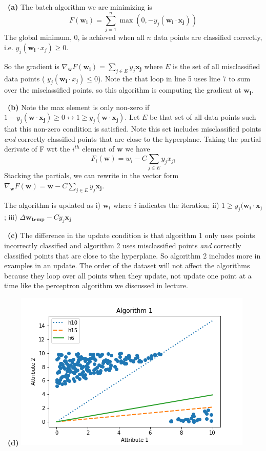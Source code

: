 \documentclass[a4 paper, 15pt]{article}
\numberwithin{equation}{section}
\newcommand{\problem}[1]{~\\\fbox{\textbf{Problem #1}}\newline\newline}
\newcommand{\subproblem}[1]{~\newline\textbf{(#1)}}
\begin{document}
\newpage
\problem{3}
\subproblem{a} The batch algorithm we are minimizing is \begin{equation*}
F(\mathbf{w_{i}}) = \sum_{j=1}^{n}\max(0, -y_{j}(\mathbf{w_{i}}\cdot \mathbf{x_{j}}))
\end{equation*}
The global minimum, 0, is achieved when all $n$ data points are classified correctly, i.e. $ y_{j}(\mathbf{w_{i}}\cdot x_{j}) \geq 0 $.
\par
So the gradient is $\nabla_{\mathbf{w}} F(\mathbf{w_{i}})= \sum_{j\in E}^{} y_{j}\mathbf{x_{j}} $ where $E$ is the set of all misclassified data points ( $y_{j}(\mathbf{w_{i}}\cdot x_{j}) \leq 0$). Note the that loop in line 5 uses line 7 to sum over the misclassified points, so this algorithm is computing the gradient at $\mathbf{w_{i}}$.
\par
\subproblem{b} Note the max element is only non-zero if $ 1 - y_{j}(\mathbf{w}\cdot \mathbf{x_{j}}) \geq 0 \leftrightarrow 1 \geq y_{j}(\mathbf{w}\cdot \mathbf{x_{j}})$.  Let $E$ be that set of all data points such that this non-zero condition is satisfied.  Note this set includes misclassified points \textit{and} correctly classified points that are close to the hyperplane.  Taking the partial derivate of F wrt the $i^{th}$ element of $\mathbf{w}$ we have \begin{equation*}
F_{i}(\mathbf{w}) = w_{i} - C \sum_{j\in E} y_{j}x_{ji}
\end{equation*}
Stacking the partials, we can rewrite in the vector form $ \nabla_{\mathbf{w}} F(\mathbf{w}) = \mathbf{w} - C \sum_{j\in E} y_{j}\mathbf{x_{j}} $.
\par
The algorithm is updated as i) $\mathbf{w_{i}}$ where $i$ indicates the iteration; ii) $ 1 \geq y_{j}(\mathbf{w_{i}}\cdot \mathbf{x_{j}}$; iii) $\Delta\mathbf{w_{temp}} - Cy_{j}\mathbf{x_{j}} $
\par
\subproblem{c} The difference in the update condition is that algorithm 1 only uses points incorrectly classified and algorithm 2 uses misclassified points \textit{and} correctly classified points that are close to the hyperplane. So algorithm 2 includes more in examples in an update.  The order of the dataset will not affect the algorithms because they loop over all points when they update, not update one point at a time like the perceptron algorithm we discussed in lecture.
\par
\subproblem{d}
\includegraphics[scale=.5]{algorithm1}
\end{document}
